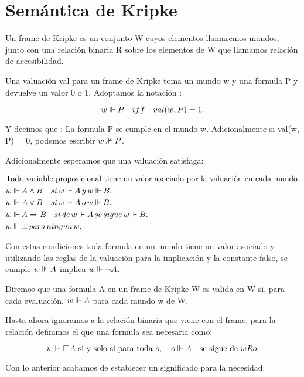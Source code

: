 \section{Semántica de Kripke}

Un frame de Kripke es un conjunto W cuyos elementos llamaremos mundos, junto con una relación binaria R sobre los elementos de W que llamamos relación de accesibilidad. 

Una valuación val para un frame de Kripke toma un mundo w y una formula P y devuelve un valor 0 o 1. Adoptamos la notación :

\begin{equation*}
  w \Vdash P \quad iff \quad val(w,P)=1.
\end{equation*}

Y decimos que : La formula P se cumple en el mundo w. Adicionalmente si val(w, P) = 0, podemos escribir $w \nVdash P$.

Adicionalmente esperamos que una valuación satisfaga:

\begin{align*}
  &\text{Toda variable proposicional tiene un valor asociado por la valuación en cada mundo}. \\
  &w \Vdash A \land B \quad si \, w \Vdash A \, y \, w \Vdash B. \\
  &w \Vdash A \lor B \quad si \, w \Vdash A \, o \, w \Vdash B. \\
  &w \Vdash A \Rightarrow B \quad si \, de \, w \Vdash A \, se \, sigue \, w \Vdash B. \\
  &w \Vdash \bot \, para \, ningun \, w. 
\end{align*}


Con estas condiciones toda formula en un mundo tiene un valor asociado y utilizando las reglas de la valuación para la implicación y la constante falso, se cumple $w \nVdash A$ implica $w \Vdash \neg A$.

Diremos que una formula A en un frame de Kripke W es valida en W si, para cada evaluación, $w \Vdash A$  para cada mundo w de W.

Hasta ahora ignoramos a la relación binaria que viene con el frame, para la relación definimos el que una formula sea necesaria como:

\begin{equation*}
  w \Vdash \square A \text{ si y solo si para toda } o, \quad o \Vdash A \quad \text{se sigue de } wRo.
\end{equation*}

Con lo anterior acabamos de establecer un significado para la necesidad.
